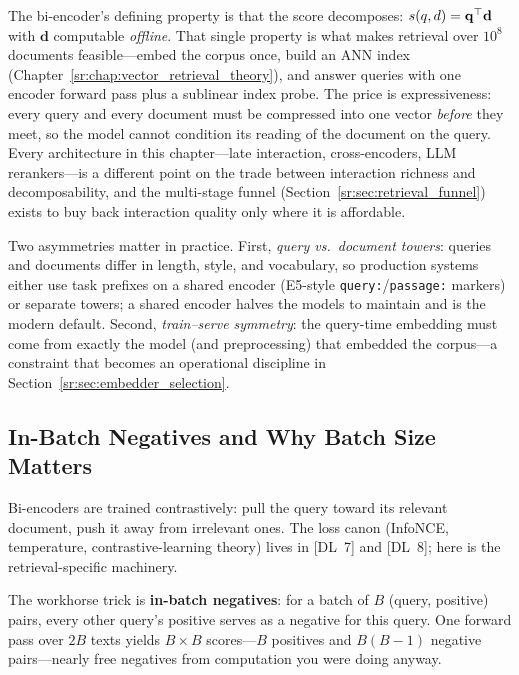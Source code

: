 \begin{keyinsight}
The bi-encoder's defining property is that the score decomposes: $s(q,d) = \mathbf{q}^\top \mathbf{d}$ with $\mathbf{d}$ computable \textit{offline}. That single property is what makes retrieval over $10^8$ documents feasible---embed the corpus once, build an ANN index (Chapter~\ref{sr:chap:vector_retrieval_theory}), and answer queries with one encoder forward pass plus a sublinear index probe. The price is expressiveness: every query and every document must be compressed into one vector \textit{before} they meet, so the model cannot condition its reading of the document on the query. Every architecture in this chapter---late interaction, cross-encoders, LLM rerankers---is a different point on the trade between interaction richness and decomposability, and the multi-stage funnel (Section~\ref{sr:sec:retrieval_funnel}) exists to buy back interaction quality only where it is affordable.
\end{keyinsight}

Two asymmetries matter in practice. First, \textit{query vs.\ document towers}: queries and documents differ in length, style, and vocabulary, so production systems either use task prefixes on a shared encoder (E5-style \texttt{query:}/\texttt{passage:} markers) or separate towers; a shared encoder halves the models to maintain and is the modern default. Second, \textit{train--serve symmetry}: the query-time embedding must come from exactly the model (and preprocessing) that embedded the corpus---a constraint that becomes an operational discipline in Section~\ref{sr:sec:embedder_selection}.

\subsection{In-Batch Negatives and Why Batch Size Matters}
\label{sr:subsec:in_batch_negatives}

Bi-encoders are trained contrastively: pull the query toward its relevant document, push it away from irrelevant ones. The loss canon (InfoNCE, temperature, contrastive-learning theory) lives in [DL~7] and [DL~8]; here is the retrieval-specific machinery.

The workhorse trick is \textbf{in-batch negatives}: for a batch of $B$ (query, positive) pairs, every other query's positive serves as a negative for this query. One forward pass over $2B$ texts yields $B \times B$ scores---$B$ positives and $B(B{-}1)$ negative pairs---nearly free negatives from computation you were doing anyway.

